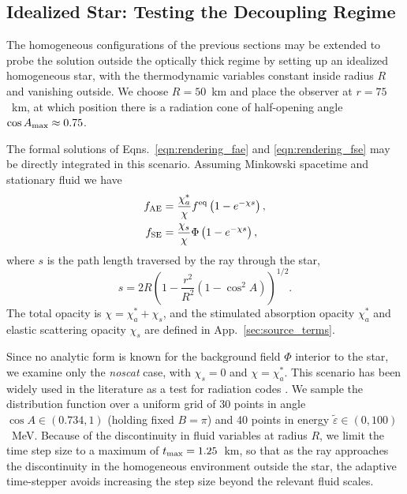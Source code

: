 \documentclass[aps,floatfix,prd,superscriptaddress,twocolumn]{revtex4-1}
\begin{document}
\subsection{Idealized Star:
  Testing the Decoupling Regime}
\label{ssec:test_ab_star}
The homogeneous configurations of the previous sections may be extended to
probe the solution outside the optically thick regime
by setting up an idealized homogeneous star, with the thermodynamic variables
constant inside radius $R$ and vanishing outside.
We choose $R=50$~km and place the observer at $r=75$~km,
at which position there is a radiation cone of half-opening angle
$\cos A_{\rm max}\approx0.75$.

The formal solutions of
Eqns.~\ref{eqn:rendering_fae} and \ref{eqn:rendering_fse}
may be directly integrated in this scenario. Assuming Minkowski spacetime
and stationary fluid we have
\begin{align}
  \label{eqn:fae_homogeneous_general}
  f_{\rm AE} &=
  \frac{\chi_a^{*}}{\chi} f^{\rm eq} \left(1-e^{-\chi s}\right), \\
  \label{eqn:fse_homogeneous_general}
  f_{\rm SE} &=
  \frac{\chi_s}{\chi} \Phi \left(1-e^{-\chi s}\right),
\end{align}
where $s$ is the path length traversed by the ray through the star,
\begin{equation}
  \label{eqn:geometric_s}
  s = 2 R \left(1-\frac{r^2}{R^2}(1-\cos^2 A)\right)^{1/2}.
\end{equation}
The total opacity is $\chi=\chi_a^*+\chi_s$, and the stimulated absorption
opacity $\chi_a^*$ and elastic scattering opacity $\chi_s$
are defined in App.~\ref{sec:source_terms}.

Since no analytic form is known for the background field $\Phi$
interior to the star, we examine only the \emph{noscat} case,
with $\chi_s=0$ and $\chi=\chi_a^{*}$.
This scenario has been widely used in the literature as a test for
radiation codes
\cite{smit1997-two_moment,abdi2012-monte_carlo,fouc2015-m1_nsbh}.
We sample the distribution function over a uniform grid of
30 points in angle $\cos A \in (0.734,1)$ (holding fixed $B=\pi$) and
40 points in energy $\tilde{\varepsilon} \in (0,100)$~MeV.
Because of the discontinuity in fluid variables at radius $R$,
we limit the time step size to a maximum of $t_{\rm max}=1.25$~km,
so that as the ray approaches the discontinuity in the homogeneous environment
outside the star, the adaptive time-stepper avoids increasing
the step size beyond the relevant fluid scales.
\end{document}
